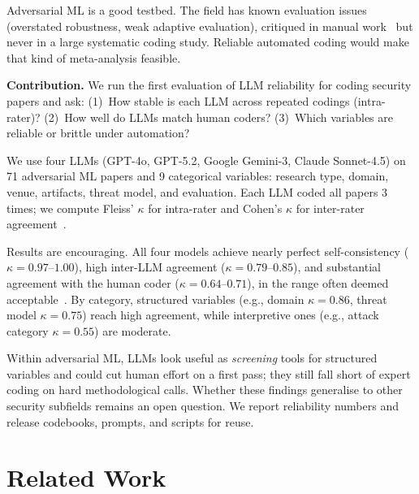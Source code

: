 \documentclass[conference,compsoc]{IEEEtran}
\begin{document}
Adversarial ML is a good testbed. The field has known evaluation issues~\cite{carlini2017towards,athalye2018obfuscated,tramer2020adaptive,arp2022dos} (overstated robustness, weak adaptive evaluation), critiqued in manual work~\cite{carlini2019evaluating} but never in a large systematic coding study. Reliable automated coding would make that kind of meta-analysis feasible.

\textbf{Contribution.} We run the first evaluation of LLM reliability for coding security papers and ask: (1)~How stable is each LLM across repeated codings (intra-rater)? (2)~How well do LLMs match human coders? (3)~Which variables are reliable or brittle under automation?

We use four LLMs (GPT-4o, GPT-5.2, Google Gemini-3, Claude Sonnet-4.5) on 71 adversarial ML papers and 9 categorical variables: research type, domain, venue, artifacts, threat model, and evaluation. Each LLM coded all papers 3 times; we compute Fleiss' $\kappa$ for intra-rater and Cohen's $\kappa$ for inter-rater agreement~\cite{krippendorff2004reliability,neuendorf2017content}.

Results are encouraging. All four models achieve nearly perfect self-consistency ($\kappa = 0.97$--$1.00$), high inter-LLM agreement ($\kappa = 0.79$--$0.85$), and substantial agreement with the human coder ($\kappa = 0.64$--$0.71$), in the range often deemed acceptable~\cite{landis1977measurement}. By category, structured variables (e.g., domain $\kappa = 0.86$, threat model $\kappa = 0.75$) reach high agreement, while interpretive ones (e.g., attack category $\kappa = 0.55$) are moderate.

Within adversarial ML, LLMs look useful as \emph{screening} tools for structured variables and could cut human effort on a first pass; they still fall short of expert coding on hard methodological calls. Whether these findings generalise to other security subfields remains an open question. We report reliability numbers and release codebooks, prompts, and scripts for reuse.

\section{Related Work}
\end{document}
